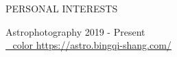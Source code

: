 \begin{rSection}{PERSONAL INTERESTS}

\small{
Astrophotography \hfill 2019 - Present
\\ \href{https://astro.bingqi-shang.com/}{\BS_color https://astro.bingqi-shang.com/}
}

\end{rSection}
